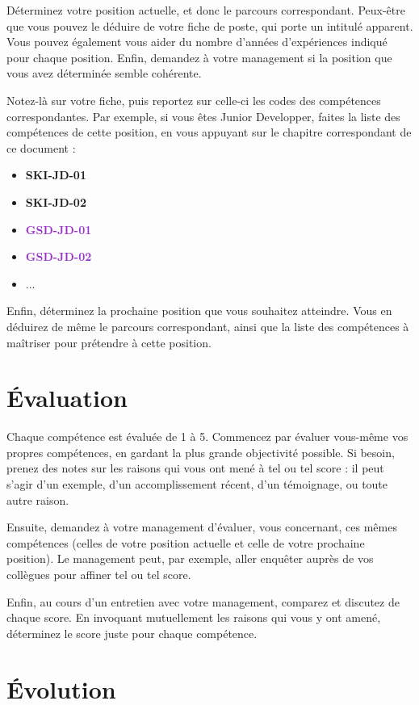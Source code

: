 \documentclass[a4paper, french, openany, 12pt]{book}
\newcommand\dex[1]{\textcolor{BrickRed}{\textbf{\uppercase{ski-{#1}}}}}
\newcommand\str[1]{\textcolor{DarkOrchid}{\textbf{\uppercase{gsd-{#1}}}}}
\begin{document}
\begin{multicols}{2}
  Déterminez votre position actuelle, et donc le parcours correspondant.
  Peux-être que vous pouvez le déduire de votre fiche de poste, qui porte un intitulé apparent.
  Vous pouvez également vous aider du nombre d'années d'expériences indiqué pour chaque position.
  Enfin, demandez à votre management si la position que vous avez déterminée semble cohérente.

  Notez-là sur votre fiche, puis reportez sur celle-ci les codes des compétences correspondantes.
  Par exemple, si vous êtes Junior Developper, faites la liste des compétences de cette position, en vous appuyant sur
  le chapitre correspondant de ce document :

  \begin{itemize}
    \item \dex{jd-01}
    \item \dex{jd-02}
    \item \str{jd-01}
    \item \str{jd-02}
    \item ...
  \end{itemize}
  
  Enfin, déterminez la prochaine position que vous souhaitez atteindre.
  Vous en déduirez de même le parcours correspondant, ainsi que la liste des compétences à maîtriser pour prétendre
  à cette position.

  \section*{Évaluation}

  Chaque compétence est évaluée de 1 à 5.
  Commencez par évaluer vous-même vos propres compétences, en gardant la plus grande objectivité possible.
  Si besoin, prenez des notes sur les raisons qui vous ont mené à tel ou tel score : il peut s'agir d'un exemple,
  d'un accomplissement récent, d'un témoignage, ou toute autre raison.

  Ensuite, demandez à votre management d'évaluer, vous concernant, ces mêmes compétences (celles de votre position 
  actuelle et celle de votre prochaine position).
  Le management peut, par exemple, aller enquêter auprès de vos collègues pour affiner tel ou tel score.

  Enfin, au cours d'un entretien avec votre management, comparez et discutez de chaque score.
  En invoquant mutuellement les raisons qui vous y ont amené, déterminez le score juste pour chaque compétence.

  \section*{Évolution}
  

\end{multicols}
\end{document}
